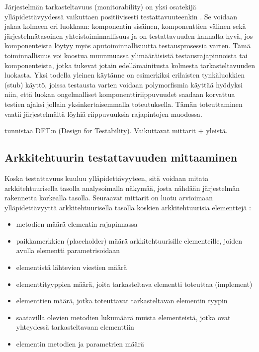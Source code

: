 \documentclass[finnish]{tktltiki2}
\theoremstyle{definition}
\theoremstyle{remark}
\begin{document}
Järjestelmän tarkasteltavuus (monitorability) on yksi osatekijä ylläpidettävyydessä vaikuttaen positiivisesti testattavuuteenkin \citep[s. 4]{mari_impact_2003}. Se voidaan jakaa kolmeen eri luokkaan: komponentin sisäinen, komponenttien välinen sekä järjestelmätasoinen yhteistoiminnallisuus ja on testattavuuden kannalta hyvä, jos komponenteista löytyy myös aputoiminnallisuutta testausprosessia varten. Tämä toiminnallisuus voi koostua muunmuassa ylimääräisistä testausrajapinnoista tai komponenteista, jotka tukevat jotain edellämainitusta kolmesta tarkasteltavuuden luokasta. Yksi todella yleinen käytänne on esimerkiksi erilaisten tynkäluokkien (stub) käyttö, joissa testausta varten voidaan polymorfismia käyttää hyödyksi niin, että luokan ongelmalliset komponenttiriippuvuudet saadaan korvattua testien ajaksi jollain yksinkertaisemmalla toteutuksella. Tämän toteuttaminen vaatii järjestelmältä löyhiä riippuvuuksia rajapintojen muodossa.

\citep[s. 591-592]{joshi_design_2014} tunnistaa DFT:n (Design for Testability). Vaikuttavat mittarit + yleistä. 




\subsection{Arkkitehtuurin testattavuuden mittaaminen}

Koska testattavuus kuuluu ylläpidettävyyteen, sitä voidaan mitata arkkitehtuurisella tasolla analysoimalla näkymää, josta nähdään järjestelmän rakennetta korkealla tasolla. Seuraavat mittarit on luotu arvioimaan ylläpidettävyyttä arkkitehtuurisella tasolla koskien arkkitehtuurisia elementtejä \citep[s. 3-4]{bengtsson1998towards}:

\begin{itemize}
	\item metodien määrä elementin rajapinnassa
	\item paikkamerkkien (placeholder) määrä arkkitehtuurisille elementeille, joiden avulla elementti parametrisoidaan
	\item elementistä lähtevien viestien määrä
	\item elementtityyppien määrä, joita tarkasteltava elementti toteuttaa (implement)
	\item elementtien määrä, jotka toteuttavat tarkasteltavan elementin tyypin
	\item saatavilla olevien metodien lukumäärä muista elementeistä, jotka ovat yhteydessä tarkasteltavaan elementtiin
	\item elementin metodien ja parametrien määrä
\end{itemize}
\end{document}
